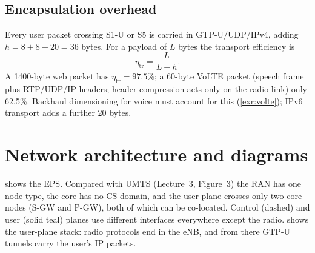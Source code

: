 \documentclass[11pt,a4paper]{article}
\begin{document}
\subsection{Encapsulation overhead}\label{sec:overhead}
Every user packet crossing S1-U or S5 is carried in GTP-U/UDP/IPv4, adding
$h = 8 + 8 + 20 = 36$ bytes. For a payload of $L$ bytes the transport efficiency is
\begin{equation}\label{eq:eff}
  \eta_{\mathrm{tr}} = \frac{L}{L + h}.
\end{equation}
A 1400-byte web packet has $\eta_{\mathrm{tr}} = 97.5\%$; a 60-byte VoLTE packet (speech
frame plus RTP/UDP/IP headers; header compression acts only on the radio link) only 62.5\%. Backhaul
dimensioning for voice must account for this (\cref{exr:volte}); IPv6 transport adds a further
20 bytes.

\section{Network architecture and diagrams}
 shows the EPS. Compared with UMTS (Lecture~3, Figure~3) the RAN has one node type,
the core has no CS domain, and the user plane crosses only two core nodes (S-GW and P-GW),
both of which can be co-located. Control (dashed) and user (solid teal) planes use different
interfaces everywhere except the radio.  shows the user-plane stack: radio
protocols end in the eNB, and from there GTP-U tunnels carry the user's IP packets.

\begin{acnfigure}
  \caption{The Evolved Packet System. Dashed blue: control plane; solid teal: user plane.}
  \label{fig:arch}
\end{acnfigure}

\begin{acnfigure}
  \caption{LTE user-plane protocol stack. The UE's IP packet is carried by PDCP/RLC/MAC over the
  radio and by GTP-U tunnels on S1-U and S5/S8; the P-GW is the IP anchor.}
  \label{fig:stack}
\end{acnfigure}

\begin{acnfigure}
  \caption{Control and user plane separation of the EPC gateways (Release~14).}
  \label{fig:cups}
\end{acnfigure}
\end{document}
